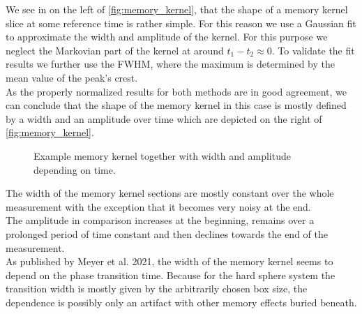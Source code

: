 We see in on the left of \autoref{fig:memory_kernel}, that the shape of a memory kernel slice at some reference time is rather simple. For this reason we use a Gaussian fit to approximate the width and amplitude of the kernel. For this purpose we neglect the Markovian part of the kernel at around $t_1-t_2 \approx 0$. To validate the fit results we further use the FWHM, where the maximum is determined by the mean value of the peak's crest.\\
As the properly normalized results for both methods are in good agreement, we can conclude that the shape of the memory kernel in this case is mostly defined by a width and an amplitude over time which are depicted on the right of \autoref{fig:memory_kernel}.\\

\begin{figure}[h]
\begin{center}
 \hspace{0.5cm}
\caption[Width and amplitude of memory kernel with example slice]{Example memory kernel together with width and amplitude depending on time.}
\label{fig:memory_kernel}
\end{center}
\end{figure}

The width of the memory kernel sections are mostly constant over the whole measurement with the exception that it becomes very noisy at the end.\\
The amplitude in comparison increases at the beginning, remains over a prolonged period of time constant and then declines towards the end of the measurement.\\
As published by Meyer et al. 2021\cite{Meyer2021}, the width of the memory kernel seems to depend on the phase transition time. Because for the hard sphere system the transition width is mostly given by the arbitrarily chosen box size, the dependence is possibly only an artifact with other memory effects buried beneath.\\ 

